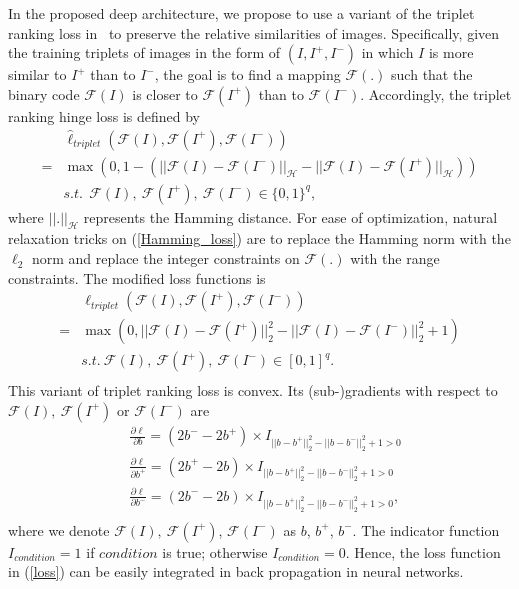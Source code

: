 \documentclass[10pt,twocolumn,letterpaper]{article}
\begin{document}
In the proposed deep architecture, we propose to use a variant of
the triplet ranking loss in~\cite{triplet} to preserve the relative
similarities of images. Specifically, given the training triplets of
images in the form of $(I,I^+,I^-)$ in which $I$ is more similar to
$I^+$ than to $I^-$, the goal is to find a mapping $\mathcal{F}(.)$
such that the binary code $\mathcal{F}(I)$ is closer to
$\mathcal{F}(I^+)$ than to $\mathcal{F}(I^-)$. Accordingly, the
triplet ranking hinge loss is defined by
\begin{equation}\label{Hamming_loss}
\begin{split}
&\hat{\ell}_{triplet}(\mathcal{F}(I),\mathcal{F}(I^+),\mathcal{F}(I^-))\\
=&\max(0,1-(||\mathcal{F}(I)-\mathcal{F}(I^-)||_\mathcal{H}-||\mathcal{F}(I)-\mathcal{F}(I^+)||_\mathcal{H}))\\
& s.t.\ \ \mathcal{F}(I),\ \mathcal{F}(I^+),\ \mathcal{F}(I^-)\in
\{0,1 \}^q,
\end{split}
\end{equation}
where $||.||_\mathcal{H}$ represents the Hamming distance. For ease of optimization, natural relaxation tricks on (\ref{Hamming_loss}) are to replace the Hamming norm with the $\ell_2$ norm and replace the integer constraints on $\mathcal{F}(.)$ with the range constraints. The modified loss functions is
\begin{equation}\label{loss}
\begin{split}
&\ell_{triplet}(\mathcal{F}(I),\mathcal{F}(I^+),\mathcal{F}(I^-))\\
=&\max(0,||\mathcal{F}(I)-\mathcal{F}(I^+)||_2^2-||\mathcal{F}(I)-\mathcal{F}(I^-)||_2^2+1)\\
&s.t.\ \mathcal{F}(I),\ \mathcal{F}(I^+),\ \mathcal{F}(I^-)
\in [0,1]^q.\\
\end{split}
\end{equation}
This variant of triplet ranking loss is convex. Its (sub-)gradients
with respect to $\mathcal{F}(I),\ \mathcal{F}(I^+)$ or
$\mathcal{F}(I^-)$ are
\begin{equation}
\begin{split}
&\frac{\partial{\ell}}{\partial{b}}=
(2b^--2b^+)\times I_{||b-b^+||_2^2-||b-b^-||_2^2+1>0}\\
&\frac{\partial{\ell}}{\partial{b^+}}=(2b^+-2b)\times I_{||b-b^+||_2^2-||b-b^-||_2^2+1>0}\\
&\frac{\partial{\ell}}{\partial{b^-}}=(2b^--2b)\times I_{||b-b^+||_2^2-||b-b^-||_2^2+1>0},\\
\end{split}
\end{equation}
where we denote $\mathcal{F}(I),\ \mathcal{F}(I^+)$,
$\mathcal{F}(I^-)$ as $b$, $b^+$, $b^-$. The indicator function
$I_{condition}=1$ if $condition$ is true; otherwise
$I_{condition}=0$. Hence, the loss function in (\ref{loss}) can be
easily integrated in back propagation in neural networks.
\end{document}
